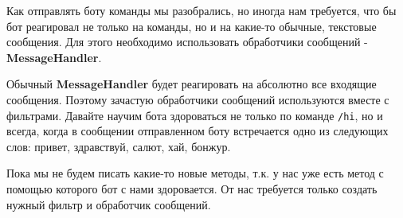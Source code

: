 \documentclass[
]{book}
\begin{document}
Как отправлять боту команды мы разобрались, но иногда нам требуется, что бы бот реагировал не только на команды, но и на какие-то обычные, текстовые сообщения. Для этого необходимо использовать обработчики сообщений - \textbf{MessageHandler}.

Обычный \textbf{MessageHandler} будет реагировать на абсолютно все входящие сообщения. Поэтому зачастую обработчики сообщений используются вместе с фильтрами. Давайте научим бота здороваться не только по команде \texttt{/hi}, но и всегда, когда в сообщении отправленном боту встречается одно из следующих слов: привет, здравствуй, салют, хай, бонжур.

Пока мы не будем писать какие-то новые методы, т.к. у нас уже есть метод с помощью которого бот с нами здоровается. От нас требуется только создать нужный фильтр и обработчик сообщений.
\end{document}
